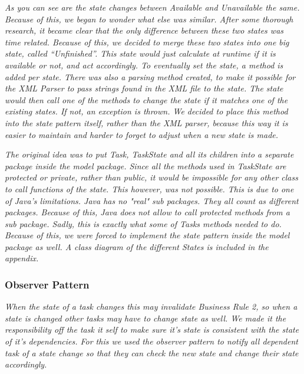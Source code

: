 				\emph{As you can see are the state changes between Available and Unavailable the same. Because of this, we began to wonder what else was similar. After some thorough research, it became clear that the only difference between these two states was time related. Because of this, we decided to merge these two states into one big state, called "`Unfinished"'. This state would just calculate at runtime if it is available or not, and act accordingly. To eventually set the state, a method is added per state. There was also a parsing method created, to make it possible for the XML Parser to pass strings found in the XML file to the state. The state would then call one of the methods to change the state if it matches one of the existing states. If not, an exception is thrown. We decided to place this method into the state pattern itself, rather than the XML parser, because this way it is easier to maintain and harder to forget to adjust when a new state is made.}
			
				\emph{The original idea was to put Task, TaskState and all its children into a separate package inside the model package. Since all the methods used in TaskState are protected or private, rather than public, it would be impossible for any other class to call functions of the state. This however, was not possible. This is due to one of Java's limitations. Java has no "real" sub packages. They all count as different packages. Because of this, Java does not allow to call protected methods from a sub package. Sadly, this is exactly what some of Tasks methods needed to do. Because of this, we were forced to implement the state pattern inside the model package as well. A class diagram of the different States is included in the appendix.}
						
			\subsubsection{Observer Pattern}
				\emph{When the state of a task changes this may invalidate Business Rule 2, so when a state is changed other tasks may have to change state as well. We made it the responsibility off the task it self to make sure it's state is consistent with the state of it's dependencies. For this we used the observer pattern to notify all dependent task of a state change so that they can check the new state and change their state accordingly.}
				
